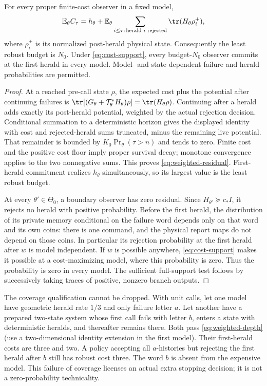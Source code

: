 \begin{theorem}\label{thm:weighted-rigidity}
For every proper finite-cost observer in a fixed model,
\begin{equation}\label{eq:weighted-residual}
 \mathbb E_\theta C_\tau
 =h_\theta+
 \mathbb E_\theta\sum_{i\le\tau:\,\text{herald }i\text{ rejected}}
            \tr(H_\theta\rho_i^+),
\end{equation}
where $\rho_i^+$ is its normalized post-herald physical state. Consequently the least robust budget is $N_0$. Under \eqref{eq:cost-support}, every budget-$N_0$ observer commits at the first herald in every model. Model- and state-dependent failure and herald probabilities are permitted.
\end{theorem}
\begin{proof}
At a reached pre-call state $\rho$, the expected cost plus the potential after continuing failures is
$\tr[(G_\theta+\mathcal T_\theta^*H_\theta)\rho]=\tr(H_\theta\rho)$.
Continuing after a herald adds exactly its post-herald potential, weighted by the actual rejection decision. Conditional summation to a deterministic horizon gives the displayed identity with cost and rejected-herald sums truncated, minus the remaining live potential. That remainder is bounded by $K_0\Pr_\theta(\tau>n)$ and tends to zero. Finite cost and the positive cost floor imply proper survival decay; monotone convergence applies to the two nonnegative sums. This proves \eqref{eq:weighted-residual}. First-herald commitment realizes $h_\theta$ simultaneously, so its largest value is the least robust budget.

At every $\theta'\in\Theta_0$, a boundary observer has zero residual. Since $H_{\theta'}\succeq c_*I$, it rejects no herald with positive probability. Before the first herald, the distribution of its private memory conditional on the failure word depends only on that word and its own coins: there is one command, and the physical report maps do not depend on those coins. In particular its rejection probability at the first herald after $w$ is model independent. If $w$ is possible anywhere, \eqref{eq:cost-support} makes it possible at a cost-maximizing model, where this probability is zero. Thus the probability is zero in every model. The sufficient full-support test follows by successively taking traces of positive, nonzero branch outputs.
\end{proof}

The coverage qualification cannot be dropped. With unit calls, let one model have geometric herald rate $1/3$ and only failure letter $a$. Let another have a prepared two-state system whose first call fails with letter $b$, enters a state with deterministic heralds, and thereafter remains there. Both pass \eqref{eq:weighted-depth} (use a two-dimensional identity extension in the first model). Their first-herald costs are three and two. A policy accepting all $a$-histories but rejecting the first herald after $b$ still has robust cost three. The word $b$ is absent from the expensive model. This failure of coverage licenses an actual extra stopping decision; it is not a zero-probability technicality.

